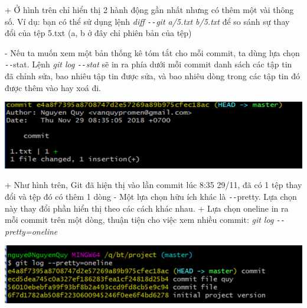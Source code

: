 \documentclass[12pt,a4paper]{report}
\begin{document}
	\label{fig:screenshot018}
\vskip 0.4cm\vskip 0.4cm
+ Ở hình trên chỉ hiển thị 2 hành động gần nhất nhưng có thêm một vài thông số. Ví dụ: bạn có thể sử dụng lệnh {\it diff \texttt{-{}-}git a/5.txt b/5.txt} để so sánh sự thay đổi của tệp 5.txt (a, b ở đây chỉ phiên bản của tệp)\vskip 0.4cm

- Nếu ta muốn xem một bản thống kê tóm tắt cho mỗi commit, ta dùng lựa chọn \texttt{-{}-}stat. Lệnh {\it git log \texttt{-{}-}stat} sẽ in ra phía dưới mỗi commit danh sách các tập tin đã chỉnh sửa, bao nhiêu tập tin được sửa, và bao nhiêu dòng trong các tập tin đó được thêm vào hay xoá đi.\vskip 0.4cm

	\includegraphics[width=0.8\linewidth]{screenshot019}

	\label{fig:screenshot019}
\vskip 0.4cm\vskip 0.4cm
+ Như hình trên, Git đã hiện thị vào lần commit lúc 8:35 29/11, đã có 1 tệp thay đổi và tệp đó có thêm 1 dòng\vskip 0.4cm
- Một lựa chọn hữu ích khác là \texttt{-{}-}pretty. Lựa chọn này thay đổi phần hiển thị theo các cách khác nhau.\vskip 0.4cm
+ Lựa chọn oneline in ra mỗi commit trên một dòng, thuận tiện cho việc xem nhiều commit: {\it git log \texttt{-{}-}pretty=oneline}\vskip 0.4cm

	\includegraphics[width=0.8\linewidth]{screenshot020}
	
\end{document}

